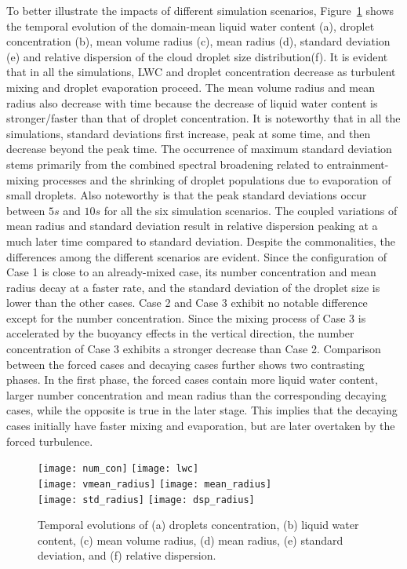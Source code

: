 \documentclass[draft,linenumbers]{agujournal}
\newcommand{\Fig}[1]{Figure~\ref{#1}}
\begin{document}
To better illustrate the impacts of different simulation scenarios, \Fig{fig:temporal_variation} shows the temporal evolution of the domain-mean liquid water content (a), droplet concentration (b), 
mean volume radius (c), mean radius (d), standard deviation (e) and relative dispersion of the cloud droplet size distribution(f). It is evident that in all the simulations, LWC and droplet concentration decrease as turbulent mixing and droplet evaporation proceed. The mean volume radius and mean radius also decrease with time because the decrease of liquid water content is stronger/faster than that of droplet concentration. It is noteworthy that in all the simulations, standard deviations first increase, peak at some time, and then decrease beyond the peak time. The occurrence of maximum standard deviation stems primarily from the combined spectral broadening related to entrainment-mixing processes and the shrinking of droplet populations due to evaporation of small droplets. Also noteworthy is that the peak standard deviations occur between $5s$ and $10s$ for all the six simulation scenarios. The coupled variations of mean radius and standard deviation result in relative dispersion peaking at a much later time compared to standard deviation. Despite the commonalities, the differences among the different scenarios are evident. Since the configuration of Case 1 is close to an already-mixed case, its number concentration and mean radius decay at a faster rate, and the standard deviation of the droplet size is lower than the other cases. Case 2 and Case 3 exhibit no notable difference except for the number concentration. Since the mixing process of Case 3 is accelerated by the buoyancy effects in the vertical direction, the number concentration of Case 3 exhibits a stronger decrease than Case 2. Comparison between the forced cases and decaying cases further shows two contrasting phases. In the first phase, the forced cases contain more liquid water content, larger number concentration and mean radius than the corresponding decaying cases, while the opposite is true in the later stage. This implies that the decaying cases initially have faster mixing and evaporation, but are later overtaken by the forced turbulence. 
  
\begin{figure}[!htbp]\centering
\texttt{[image: num\_con]}
\texttt{[image: lwc]}\\
\texttt{[image: vmean\_radius]}
\texttt{[image: mean\_radius]}\\
\texttt{[image: std\_radius]}
\texttt{[image: dsp\_radius]}
\caption{Temporal evolutions of (a) droplets concentration, (b) liquid water content, (c) mean volume radius, (d) mean radius, (e) standard deviation, and (f) relative dispersion.}\label{fig:temporal_variation} 
\end{figure}
\end{document}
